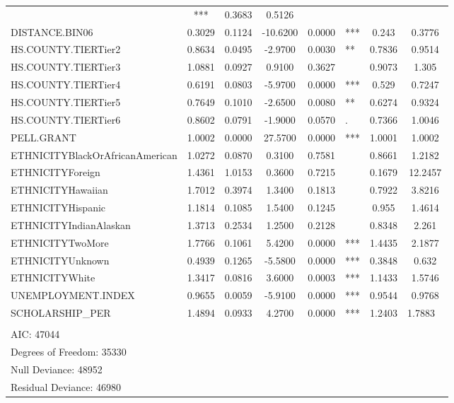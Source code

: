 \documentclass[12pt,english]{report}
\begin{document}
\begin{table}[]
\begin{adjustbox}{width=1.05\textwidth}
\begin{tabular}{lcccllcc}
& ***         & 0.3683 & 0.5126  \\
DISTANCE.BIN06                  & 0.3029   & 0.1124     & -10.6200 & 0.0000    
& ***         & 0.243  & 0.3776  \\
HS.COUNTY.TIERTier2             & 0.8634   & 0.0495     & -2.9700  & 0.0030    
& **          & 0.7836 & 0.9514  \\
HS.COUNTY.TIERTier3             & 1.0881   & 0.0927     & 0.9100   & 0.3627    
&             & 0.9073 & 1.305   \\
HS.COUNTY.TIERTier4             & 0.6191   & 0.0803     & -5.9700  & 0.0000    
& ***         & 0.529  & 0.7247  \\
HS.COUNTY.TIERTier5             & 0.7649   & 0.1010     & -2.6500  & 0.0080    
& **          & 0.6274 & 0.9324  \\
HS.COUNTY.TIERTier6             & 0.8602   & 0.0791     & -1.9000  & 0.0570    
& .           & 0.7366 & 1.0046  \\
PELL.GRANT                      & 1.0002   & 0.0000     & 27.5700  & 0.0000    
& ***         & 1.0001 & 1.0002  \\
ETHNICITYBlackOrAfricanAmerican & 1.0272   & 0.0870     & 0.3100   & 0.7581    
&             & 0.8661 & 1.2182  \\
ETHNICITYForeign                & 1.4361   & 1.0153     & 0.3600   & 0.7215    
&             & 0.1679 & 12.2457 \\
ETHNICITYHawaiian               & 1.7012   & 0.3974     & 1.3400   & 0.1813    
&             & 0.7922 & 3.8216  \\
ETHNICITYHispanic               & 1.1814   & 0.1085     & 1.5400   & 0.1245    
&             & 0.955  & 1.4614  \\
ETHNICITYIndianAlaskan          & 1.3713   & 0.2534     & 1.2500   & 0.2128    
&             & 0.8348 & 2.261   \\
ETHNICITYTwoMore                & 1.7766   & 0.1061     & 5.4200   & 0.0000    
& ***         & 1.4435 & 2.1877  \\
ETHNICITYUnknown                & 0.4939   & 0.1265     & -5.5800  & 0.0000    
& ***         & 0.3848 & 0.632   \\
ETHNICITYWhite                  & 1.3417   & 0.0816     & 3.6000   & 0.0003    
& ***         & 1.1433 & 1.5746  \\
UNEMPLOYMENT.INDEX              & 0.9655   & 0.0059     & -5.9100  & 0.0000    
& ***         & 0.9544 & 0.9768  \\
SCHOLARSHIP\_PER                & 1.4894   & 0.0933     & 4.2700   & 0.0000    
& ***         & 1.2403 & 1.7883     \
\\
\\
AIC: 47044\\
Degrees of Freedom: 35330 \\
Null Deviance:      48952 \\
Residual Deviance: 46980


\end{tabular}
\end{adjustbox}
\end{table}
\end{document}
